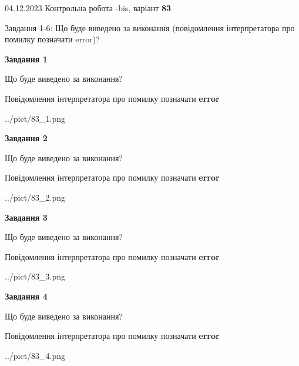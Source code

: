 \documentclass[12pt, ukrainian]{article}
\begin{document}
{{04.12.2023 Контрольна робота -bis, варіант  \No \textbf { 83 }\par}}
{

Завдання 1-6: Що буде виведено за виконання (повідомлення інтерпретатора про помилку позначати error)?


{\begin {center}\textbf{Завдання 1}\end {center}}\par
Що буде виведено за виконання? \par
Повідомлення інтерпретатора про помилку позначати \textbf{error}

\begin{center}
	{../pict/83_1.png}
\end{center}
\newpage

{\begin {center}\textbf{Завдання 2}\end {center}}\par
Що буде виведено за виконання? \par
Повідомлення інтерпретатора про помилку позначати \textbf{error}

\begin{center}
	{../pict/83_2.png}
\end{center}
\newpage

{\begin {center}\textbf{Завдання 3}\end {center}}\par
Що буде виведено за виконання? \par
Повідомлення інтерпретатора про помилку позначати \textbf{error}

\begin{center}
	{../pict/83_3.png}
\end{center}
\newpage

{\begin {center}\textbf{Завдання 4}\end {center}}\par
Що буде виведено за виконання? \par
Повідомлення інтерпретатора про помилку позначати \textbf{error}

\begin{center}
	{../pict/83_4.png}
\end{center}
\newpage

}
\end{document}
